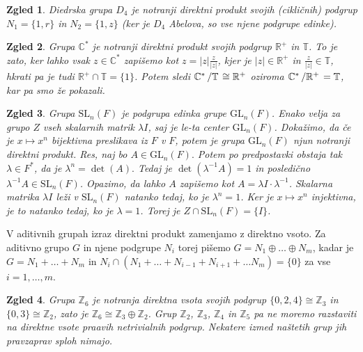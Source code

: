 \documentclass[10pt, a4paper]{article}
\newtheorem{zgled}{Zgled}[section]
\newcommand{\Z}{\mathbb {Z}}
\newcommand{\R}{\mathbb {R}}
\newcommand{\C}{\mathbb {C}}
\newcommand{\quot}[2]{{\raisebox{0em}{$#1$}\left/\raisebox{0em}{$#2$}\right.}}
\begin{document}
\begin{zgled}
  Diedrska grupa $D_4$ je notranji direktni produkt svojih (cikličnih) podgrup 
  $N_1 = \{1, r\}$ in $N_2 = \{1, z\}$ (ker je $D_4$ Abelova, so vse njene podgrupe edinke).
\end{zgled}

\begin{zgled}
  Grupa $\C^*$ je notranji direktni produkt svojih podgrup 
  $\R^+$ in $\mathbb{T}$. To je zato, ker lahko vsak $z \in \C^*$
  zapišemo kot $z = |z| \frac{z}{|z|}$, kjer je $|z| \in \R^+$ in $\frac{z}{|z|} \in \mathbb{T}$,
  hkrati pa je tudi $\R^+ \cap \mathbb{T} = \{1\}$.
  Potem sledi $\quot{\C^*}{\mathbb{T}} \cong \R^+$ oziroma $\quot{\C^*}{\R^+} = \mathbb{T}$,
  kar pa smo že pokazali.
\end{zgled}

\begin{zgled}
  Grupa $\mathrm{SL}_n (F)$ je podgrupa edinka grupe $\mathrm{GL}_n (F)$.
  Enako velja za grupo $Z$ vseh skalarnih matrik $\lambda I$, saj je le-ta center $\mathrm{GL}_n (F)$.
  Dokažimo, da če je $x \mapsto x^n$ bijektivna preslikava iz $F$ v $F$,
  potem je grupa $\mathrm{GL}_n (F)$ njun notranji direktni produkt.
  Res, naj bo $A \in \mathrm{GL}_n (F).$ Potem po predpostavki obstaja tak $\lambda \in F^*$,
  da je $\lambda^n = \det (A).$ 
  Tedaj je $\det (\lambda^{-1} A) = 1$ in posledično $\lambda^{-1} A \in \mathrm{SL}_n (F)$.
  Opazimo, da lahko $A$ zapišemo kot $A = \lambda I \cdot \lambda^{-1}$.
  Skalarna matrika $\lambda I$ leži v $\mathrm{SL}_n (F)$ natanko tedaj, ko je $\lambda^n = 1$.
  Ker je $x \mapsto x^n$ injektivna, je to natanko tedaj, ko je $\lambda = 1$.
  Torej je $Z \cap \mathrm{SL}_n (F) = \{I\}$.
\end{zgled}

V aditivnih grupah izraz direktni produkt zamenjamo z direktno vsoto.
Za aditivno grupo $G$ in njene podgrupe $N_i$ torej pišemo 
$G = N_1 \oplus \dots \oplus N_m$, kadar je $G = N_1 + \dots + N_m$
in $N_i \cap (N_1 + \dots + N_{i - 1} + N_{i + 1} + \dots N_m) = \{0\}$
za vse $i = 1, \dots, m.$

\begin{zgled}
  Grupa $\Z_6$ je notranja direktna vsota svojih podgrup $\{0, 2, 4\} \cong \Z_3$
  in $\{0, 3\} \cong \Z_2$, zato je $\Z_6 \cong \Z_3 \oplus \Z_2$.
  Grup $\Z_2$, $\Z_3$, $\Z_4$ in $\Z_5$ pa ne moremo razstaviti na direktne vsote praavih netrivialnih podgrup.
  Nekatere izmed naštetih grup jih pravzaprav sploh nimajo.
\end{zgled}
\end{document}

